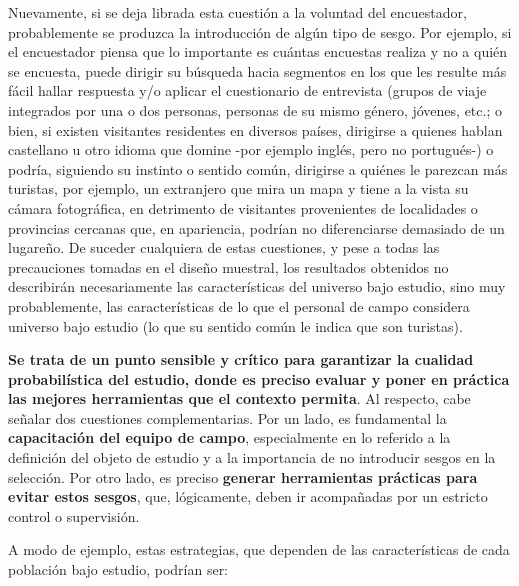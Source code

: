 \documentclass[
]{book}
\begin{document}
Nuevamente, si se deja librada esta cuestión a la voluntad del encuestador, probablemente se produzca la introducción de algún tipo de sesgo. Por ejemplo, si el encuestador piensa que lo importante es cuántas encuestas realiza y no a quién se encuesta, puede dirigir su búsqueda hacia segmentos en los que les resulte más fácil hallar respuesta y/o aplicar el cuestionario de entrevista (grupos de viaje integrados por una o dos personas, personas de su mismo género, jóvenes, etc.; o bien, si existen visitantes residentes en diversos países, dirigirse a quienes hablan castellano u otro idioma que domine -por ejemplo inglés, pero no portugués-) o podría, siguiendo su instinto o sentido común, dirigirse a quiénes le parezcan más turistas, por ejemplo, un extranjero que mira un mapa y tiene a la vista su cámara fotográfica, en detrimento de visitantes provenientes de localidades o provincias cercanas que, en apariencia, podrían no diferenciarse demasiado de un lugareño. De suceder cualquiera de estas cuestiones, y pese a todas las precauciones tomadas en el diseño muestral, los resultados obtenidos no describirán necesariamente las características del universo bajo estudio, sino muy probablemente, las características de lo que el personal de campo considera universo bajo estudio (lo que su sentido común le indica que son turistas).

\textbf{Se trata de un punto sensible y crítico para garantizar la cualidad probabilística del estudio, donde es preciso evaluar y poner en práctica las mejores herramientas que el contexto permita}. Al respecto, cabe señalar dos cuestiones complementarias. Por un lado, es fundamental la \textbf{capacitación del equipo de campo}, especialmente en lo referido a la definición del objeto de estudio y a la importancia de no introducir sesgos en la selección. Por otro lado, es preciso \textbf{generar herramientas prácticas para evitar estos sesgos}, que, lógicamente, deben ir acompañadas por un estricto control o supervisión.

A modo de ejemplo, estas estrategias, que dependen de las características de cada población bajo estudio, podrían ser:
\end{document}
